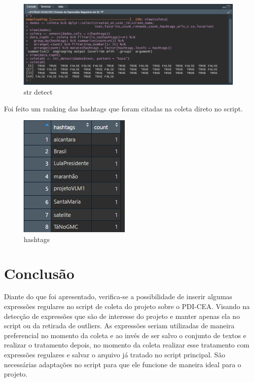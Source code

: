 \documentclass[a4paper]{article}
\begin{document}
\begin{figure}[htb!]
    \centering
    \includegraphics[width=0.9\linewidth]{style/image/teste02.png}
    \caption{str detect}
    \label{fig:str_detect}
\end{figure}
Foi feito um ranking das hashtags que foram citadas na coleta direto no script. 
\begin{figure}[htb!]
    \centering
    \includegraphics[width=0.5\linewidth]{style/image/teste04-hashtags.png}
    \caption{hashtags}
    \label{fig:hashtags}
\end{figure}

\section{Conclusão}
Diante do que foi apresentado, verifica-se a possibilidade de inserir algumas expressões regulares no script de coleta do projeto sobre o PDI-CEA. Visando na detecção de expressões que são de interesse do projeto e manter apenas ela no script ou da retirada de outliers.
As expressões seriam utilizadas de maneira preferencial no momento da coleta e ao invés de ser salvo o conjunto de textos e realizar o tratamento depois, no momento da coleta realizar esse tratamento com expressões regulares e salvar o arquivo já tratado no script principal.
São necessárias adaptações no script para que ele funcione de maneira ideal para o projeto. 
\bigskip
\end{document}
